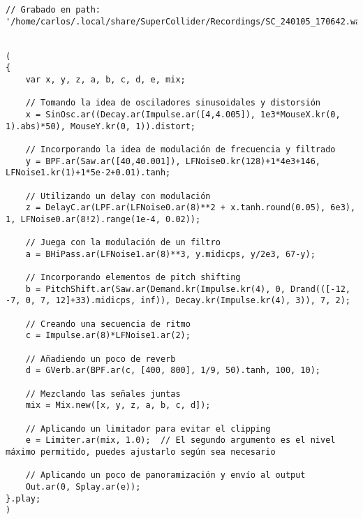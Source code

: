 \begin{minipage}[t]{1\textwidth}
    \centering
    \begin{lstlisting}[style=SuperCollider-IDE, basicstyle=\footnotesize\ttfamily, numbers=none]
// Grabado en path: '/home/carlos/.local/share/SuperCollider/Recordings/SC_240105_170642.wav'


(
{
    var x, y, z, a, b, c, d, e, mix;

    // Tomando la idea de osciladores sinusoidales y distorsión
    x = SinOsc.ar((Decay.ar(Impulse.ar([4,4.005]), 1e3*MouseX.kr(0, 1).abs)*50), MouseY.kr(0, 1)).distort;

    // Incorporando la idea de modulación de frecuencia y filtrado
    y = BPF.ar(Saw.ar([40,40.001]), LFNoise0.kr(128)+1*4e3+146, LFNoise1.kr(1)+1*5e-2+0.01).tanh;

    // Utilizando un delay con modulación
    z = DelayC.ar(LPF.ar(LFNoise0.ar(8)**2 + x.tanh.round(0.05), 6e3), 1, LFNoise0.ar(8!2).range(1e-4, 0.02));

    // Juega con la modulación de un filtro
    a = BHiPass.ar(LFNoise1.ar(8)**3, y.midicps, y/2e3, 67-y);

    // Incorporando elementos de pitch shifting
    b = PitchShift.ar(Saw.ar(Demand.kr(Impulse.kr(4), 0, Drand(([-12, -7, 0, 7, 12]+33).midicps, inf)), Decay.kr(Impulse.kr(4), 3)), 7, 2);

    // Creando una secuencia de ritmo
    c = Impulse.ar(8)*LFNoise1.ar(2);

    // Añadiendo un poco de reverb
    d = GVerb.ar(BPF.ar(c, [400, 800], 1/9, 50).tanh, 100, 10);

    // Mezclando las señales juntas
    mix = Mix.new([x, y, z, a, b, c, d]);

    // Aplicando un limitador para evitar el clipping
    e = Limiter.ar(mix, 1.0);  // El segundo argumento es el nivel máximo permitido, puedes ajustarlo según sea necesario

    // Aplicando un poco de panoramización y envío al output
    Out.ar(0, Splay.ar(e));
}.play;
)              
    \end{lstlisting}
    \vspace{1cm}
\end{minipage}











